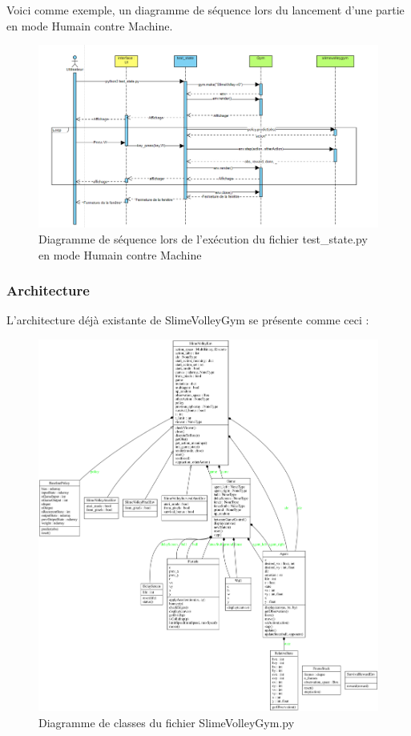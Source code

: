 \documentclass[11pt, a4paper]{article}
\begin{document}
Voici comme exemple, un diagramme de séquence lors du lancement d'une partie en mode Humain contre Machine.
 \begin{figure}[H]
    \centering
    \includegraphics[scale=0.5]{images/diagramme_sequence.PNG}
    \caption {Diagramme de séquence lors de l’exécution du fichier test\_state.py en mode Humain contre Machine}
\end{figure}
\hypertarget{link2}{\subsubsection{Architecture}}
L'architecture déjà existante de SlimeVolleyGym se présente comme ceci :
\begin{figure}[H]
    \centering
    \includegraphics[scale=0.25]{images/classes.png}
    \caption {Diagramme de classes du fichier SlimeVolleyGym.py}
\end{figure}
\end{document}

